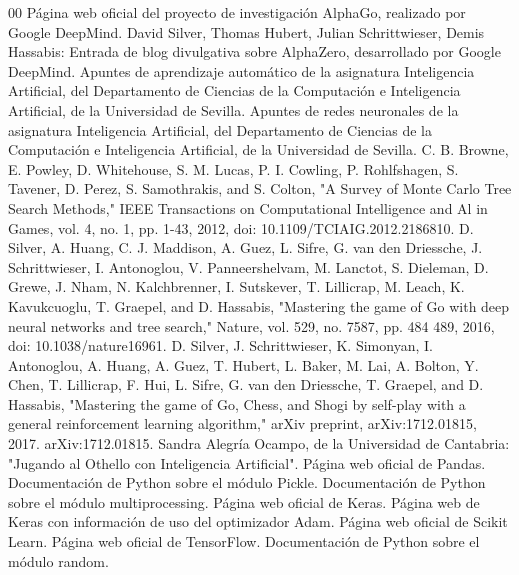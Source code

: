 \documentclass[conference,a4paper]{IEEEtran}
\begin{document}
\begin{thebibliography}{00}
 Página web oficial del proyecto de investigación AlphaGo, realizado por Google DeepMind. 
 David Silver, Thomas Hubert, Julian Schrittwieser, Demis Hassabis: Entrada de blog divulgativa sobre AlphaZero, desarrollado por Google DeepMind. 
 Apuntes de aprendizaje automático de la asignatura Inteligencia Artificial, del Departamento de Ciencias de la Computación e Inteligencia Artificial, de la Universidad de Sevilla. 
 Apuntes de redes neuronales de la asignatura Inteligencia Artificial, del Departamento de Ciencias de la Computación e Inteligencia Artificial, de la Universidad de Sevilla. 
 C. B. Browne, E. Powley, D. Whitehouse, S. M. Lucas, P. I. Cowling, P. Rohlfshagen, S. Tavener, D. Perez, S. Samothrakis, and S. Colton, "A Survey of Monte Carlo Tree Search Methods," IEEE Transactions on Computational Intelligence and Al in Games, vol. 4, no. 1, pp. 1-43, 2012, doi: 10.1109/TCIAIG.2012.2186810. 
 D. Silver, A. Huang, C. J. Maddison, A. Guez, L. Sifre, G. van den Driessche, J. Schrittwieser, I. Antonoglou, V. Panneershelvam, M. Lanctot, S. Dieleman, D. Grewe, J. Nham, N. Kalchbrenner, I. Sutskever, T. Lillicrap, M. Leach, K. Kavukcuoglu, T. Graepel, and D. Hassabis, "Mastering the game of Go with deep neural networks and tree search," Nature, vol. 529, no. 7587, pp. 484 489, 2016, doi: 10.1038/nature16961. 
 D. Silver, J. Schrittwieser, K. Simonyan, I. Antonoglou, A. Huang, A. Guez, T. Hubert, L. Baker, M. Lai, A. Bolton, Y. Chen, T. Lillicrap, F. Hui, L. Sifre, G. van den Driessche, T. Graepel, and D. Hassabis, "Mastering the game of Go, Chess, and Shogi by self-play with a general reinforcement learning algorithm," arXiv preprint, arXiv:1712.01815, 2017. arXiv:1712.01815. 
 Sandra Alegría Ocampo, de la Universidad de Cantabria: "Jugando al Othello con Inteligencia Artificial". 
 Página web oficial de Pandas. 
 Documentación de Python sobre el módulo Pickle. 
 Documentación de Python sobre el módulo multiprocessing. 
 Página web oficial de Keras. 
 Página web de Keras con información de uso del optimizador Adam. 
 Página web oficial de Scikit Learn. 
 Página web oficial de TensorFlow. 
 Documentación de Python sobre el módulo random. 
\end{thebibliography}
\end{document}
